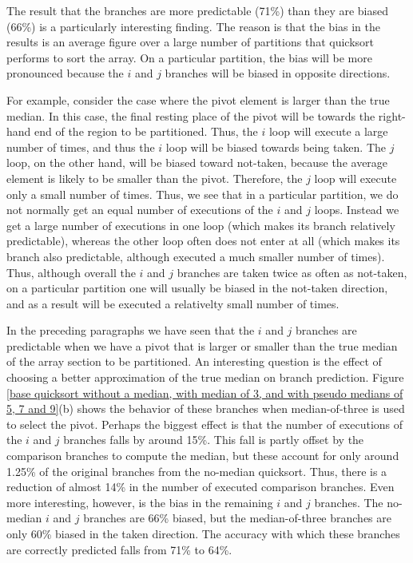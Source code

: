 The result that the branches are more predictable (71\%) than they are
biased (66\%) is a particularly interesting finding. The reason is that
the bias in the results is an average figure over a large number of
partitions that quicksort performs to sort the array. On a particular
partition, the bias will be more pronounced because the $i$ and $j$
branches will be biased in opposite directions.

For example, consider the case where the pivot element is larger than
the true median. In this case, the final resting place of the pivot
will be towards the right-hand end of the region to be
partitioned. Thus, the $i$ loop will execute a large number of times,
and thus the $i$ loop will be biased towards being taken. The $j$
loop, on the other hand, will be biased toward not-taken, because the
average element is likely to be smaller than the pivot. Therefore, the
$j$ loop will execute only a small number of times. Thus, we see that
in a particular partition, we do not normally get an equal number of
executions of the $i$ and $j$ loops. Instead we get a large number of
executions in one loop (which makes its branch relatively
predictable), whereas the other loop often does not enter at all
(which makes its branch also predictable, although executed a much
smaller number of times). Thus, although overall the $i$ and $j$
branches are taken twice as often as not-taken, on a particular
partition one will usually be biased in the not-taken direction, and
as a result will be executed a relativelty small number of times.

In the preceding paragraphs we have seen that the $i$ and $j$ branches
are predictable when we have a pivot that is larger or smaller than
the true median of the array section to be partitioned. An interesting
question is the effect of choosing a better approximation of the true
median on branch prediction. Figure \ref{base quicksort without a
median, with median of 3, and with pseudo medians of 5, 7 and 9}(b)
shows the behavior of these branches when median-of-three is used to
select the pivot. Perhaps the biggest effect is that the number of
executions of the $i$ and $j$ branches falls by around 15\%. This fall
is partly offset by the comparison branches to compute the median, but
these account for only around 1.25\% of the original branches from the
no-median quicksort. Thus, there is a reduction of almost 14\% in the
number of executed comparison branches. Even more interesting, however,
is the bias in the remaining $i$ and $j$ branches. The no-median $i$ and
$j$ branches are 66\% biased, but the median-of-three branches are
only 60\% biased in the taken direction. The accuracy with which
these branches are correctly predicted falls from 71\% to 64\%.

